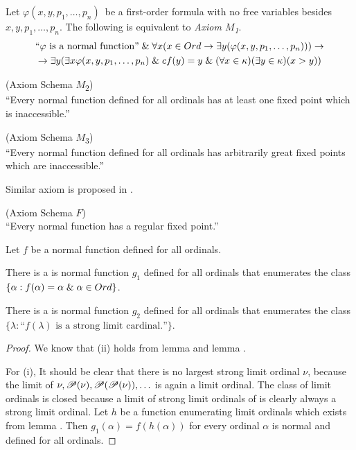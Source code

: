 Let $\varphi(x, y, p_1, \ldots, p_n)$ be a first-order formula with no free variables besides $x, y, p_1, \ldots, p_n$. The following is equivalent to \emph{Axiom $M$\textsubscript{1}}.
\begin{equation}
\begin{gathered}
\mbox{``$\varphi$ is a normal function''} \et \forall x (x \in Ord \then \exists y(\varphi(x, y, p_1, \ldots, p_n))) \then\\
\then \exists y (\exists x \varphi(x, y, p_1, \ldots, p_n) \et cf(y) = y \et (\forall x \in \kappa)(\exists y \in \kappa)(x > y))
\end{gathered}
\end{equation}

\begin{definition}{(Axiom Schema $M$\textsubscript{2})}\\
``Every normal function defined for all ordinals has at least one fixed point which is inaccessible.''
\end{definition}

\begin{definition}{(Axiom Schema $M$\textsubscript{3})}\\
``Every normal function defined for all ordinals has arbitrarily great fixed points which are inaccessible.''
\end{definition}

Similar axiom is proposed in \cite{DrakeBook}.
\begin{definition}{(Axiom Schema $F$)}\label{def:axiom_f}\\
``Every normal function has a regular fixed point.''
\end{definition}

\begin{lemma}\label{lemma:limit_fixed_normal_function}
Let $f$ be a normal function defined for all ordinals.
\bce[(i)]
\item There is a is normal function $g_1$ defined for all ordinals that enumerates the class $\{\alpha : f(\alpha) = \alpha \mathrel{\&} \alpha \in Ord \}$.
\item There is a is normal function $g_2$ defined for all ordinals that enumerates the class $\{ \lambda : \mbox{``$f(\lambda)$ is a strong limit cardinal.''}\}$. 
\ece
\end{lemma}

\begin{proof}
We know that (ii) holds from lemma  and lemma .

For (i), It should be clear that there is no largest strong limit ordinal $\nu$, because the limit of $\nu, \mathscr{P} (\nu), \mathscr{P} (\mathscr{P} (\nu)), \ldots$ is again a limit ordinal. %
The class of limit ordinals is closed because a limit of strong limit ordinals of is clearly always a strong limit ordinal.
Let $h$ be a function enumerating limit ordinals which exists from lemma . 
Then $g_1(\alpha) = f(h(\alpha))$ for every ordinal $\alpha$ is normal and defined for all ordinals.
\end{proof}

